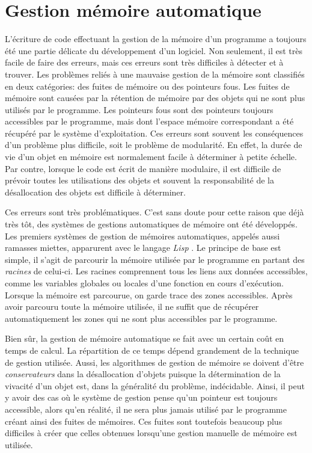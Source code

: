 \documentclass[12pt,twoside,letterpaper,francais]{book}
\newcommand{\lisp}{{\textit{Lisp }}}
\begin{document}
\section{Gestion mémoire automatique}
L'écriture de code effectuant la gestion de la mémoire d'un programme
a toujours été une partie délicate du développement d'un logiciel. Non
seulement, il est très facile de faire des erreurs, mais ces erreurs
sont très difficiles à détecter et à trouver. Les problèmes reliés à
une mauvaise gestion de la mémoire sont classifiés en deux catégories:
des fuites de mémoire ou des pointeurs fous. Les fuites de mémoire
sont causées par la rétention de mémoire par des objets qui ne sont
plus utilisés par le programme. Les pointeurs fous sont des pointeurs
toujours accessibles par le programme, mais dont l'espace mémoire
correspondant a été récupéré par le système d'exploitation. Ces
erreurs sont souvent les conséquences d'un problème plus difficile,
soit le problème de modularité. En effet, la durée de vie d'un objet
en mémoire est normalement facile à déterminer à petite échelle. Par
contre, lorsque le code est écrit de manière modulaire, il est
difficile de prévoir toutes les utilisations des objets et souvent la
responsabilité de la désallocation des objets est difficile à
déterminer.

Ces erreurs sont très problématiques. C'est sans doute pour cette
raison que déjà très tôt, des systèmes de gestions automatiques de
mémoire ont été développés. Les premiers systèmes de gestion de
mémoires automatiques, appelés aussi ramasses miettes, apparurent avec
le langage \lisp. Le principe de base est simple, il s'agit de
parcourir la mémoire utilisée par le programme en partant des
\emph{racines} de celui-ci. Les racines comprennent tous les liens aux
données accessibles, comme les variables globales ou locales d'une
fonction en cours d'exécution. Lorsque la mémoire est parcourue, on
garde trace des zones accessibles. Après avoir parcouru toute la
mémoire utilisée, il ne suffit que de récupérer automatiquement les
zones qui ne sont plus accessibles par le programme.

Bien sûr, la gestion de mémoire automatique se fait avec un certain
coût en temps de calcul. La répartition de ce temps dépend grandement
de la technique de gestion utilisée. Aussi, les algorithmes de gestion
de mémoire se doivent d'être \emph{conservateurs} dans la
désallocation d'objets puisque la détermination de la vivacité d'un
objet est, dans la généralité du problème, indécidable. Ainsi, il peut
y avoir des cas où le système de gestion pense qu'un pointeur est
toujours accessible, alors qu'en réalité, il ne sera plus jamais
utilisé par le programme créant ainsi des fuites de mémoires. Ces
fuites sont toutefois beaucoup plus difficiles à créer que celles
obtenues lorsqu'une gestion manuelle de mémoire est utilisée.
\end{document}
